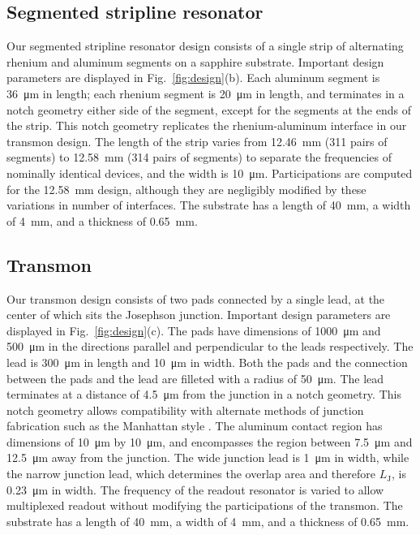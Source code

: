 \documentclass[
    reprint,
    superscriptaddress,
    amsmath,amssymb,
    aps,
    prb,
    floatfix,
]{revtex4-2}
\begin{document}
\subsection{Segmented stripline resonator}

Our segmented stripline resonator design consists of a single strip of alternating rhenium and aluminum segments on a sapphire substrate. Important design parameters are displayed in Fig.~\ref{fig:design}(b). Each aluminum segment is \SI{36}{\micro\meter} in length; each rhenium segment is \SI{20}{\micro\meter} in length, and terminates in a notch geometry either side of the segment, except for the segments at the ends of the strip. This notch geometry replicates the rhenium-aluminum interface in our transmon design. The length of the strip varies from \SI{12.46}{\milli\meter} (311 pairs of segments) to \SI{12.58}{\milli\meter} (314 pairs of segments) to separate the frequencies of nominally identical devices, and the width is \SI{10}{\micro\meter}. Participations are computed for the \SI{12.58}{\milli\meter} design, although they are negligibly modified by these variations in number of interfaces. The substrate has a length of \SI{40}{\milli\meter}, a width of \SI{4}{\milli\meter}, and a thickness of \SI{0.65}{\milli\meter}.

\subsection{Transmon}

Our transmon design consists of two pads connected by a single lead, at the center of which sits the Josephson junction. Important design parameters are displayed in Fig.~\ref{fig:design}(c). The pads have dimensions of \SI{1000}{\micro\meter} and \SI{500}{\micro\meter} in the directions parallel and perpendicular to the leads respectively. The lead is \SI{300}{\micro\meter} in length and \SI{10}{\micro\meter} in width. Both the pads and the connection between the pads and the lead are filleted with a radius of \SI{50}{\micro\meter}. The lead terminates at a distance of \SI{4.5}{\micro\meter} from the junction in a notch geometry. This notch geometry allows compatibility with alternate methods of junction fabrication such as the Manhattan style \cite{potts2001}. The aluminum contact region has dimensions of \SI{10}{\micro\meter} by \SI{10}{\micro\meter}, and encompasses the region between \SI{7.5}{\micro\meter} and \SI{12.5}{\micro\meter} away from the junction. The wide junction lead is \SI{1}{\micro\meter} in width, while the narrow junction lead, which determines the overlap area and therefore $L_\mathrm{J}$, is \SI{0.23}{\micro\meter} in width. The frequency of the readout resonator is varied to allow multiplexed readout without modifying the participations of the transmon. The substrate has a length of \SI{40}{\milli\meter}, a width of \SI{4}{\milli\meter}, and a thickness of \SI{0.65}{\milli\meter}.
\end{document}
